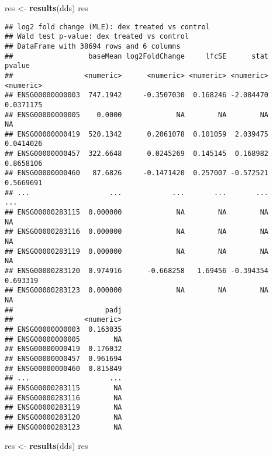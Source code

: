 \documentclass[
]{article}
\newenvironment{Shaded}{\begin{snugshade}}{\end{snugshade}}
\newcommand{\FunctionTok}[1]{\textcolor[rgb]{0.13,0.29,0.53}{\textbf{#1}}}
\newcommand{\NormalTok}[1]{#1}
\newcommand{\OtherTok}[1]{\textcolor[rgb]{0.56,0.35,0.01}{#1}}
\begin{document}
\begin{Shaded}
\begin{Highlighting}[]
\NormalTok{res }\OtherTok{\textless{}{-}} \FunctionTok{results}\NormalTok{(dds)}
\NormalTok{res}
\end{Highlighting}
\end{Shaded}

\begin{verbatim}
## log2 fold change (MLE): dex treated vs control 
## Wald test p-value: dex treated vs control 
## DataFrame with 38694 rows and 6 columns
##                  baseMean log2FoldChange     lfcSE      stat    pvalue
##                 <numeric>      <numeric> <numeric> <numeric> <numeric>
## ENSG00000000003  747.1942     -0.3507030  0.168246 -2.084470 0.0371175
## ENSG00000000005    0.0000             NA        NA        NA        NA
## ENSG00000000419  520.1342      0.2061078  0.101059  2.039475 0.0414026
## ENSG00000000457  322.6648      0.0245269  0.145145  0.168982 0.8658106
## ENSG00000000460   87.6826     -0.1471420  0.257007 -0.572521 0.5669691
## ...                   ...            ...       ...       ...       ...
## ENSG00000283115  0.000000             NA        NA        NA        NA
## ENSG00000283116  0.000000             NA        NA        NA        NA
## ENSG00000283119  0.000000             NA        NA        NA        NA
## ENSG00000283120  0.974916      -0.668258   1.69456 -0.394354  0.693319
## ENSG00000283123  0.000000             NA        NA        NA        NA
##                      padj
##                 <numeric>
## ENSG00000000003  0.163035
## ENSG00000000005        NA
## ENSG00000000419  0.176032
## ENSG00000000457  0.961694
## ENSG00000000460  0.815849
## ...                   ...
## ENSG00000283115        NA
## ENSG00000283116        NA
## ENSG00000283119        NA
## ENSG00000283120        NA
## ENSG00000283123        NA
\end{verbatim}

\begin{Shaded}
\begin{Highlighting}[]
\NormalTok{res }\OtherTok{\textless{}{-}} \FunctionTok{results}\NormalTok{(dds)}
\NormalTok{res}
\end{Highlighting}
\end{Shaded}
\end{document}
